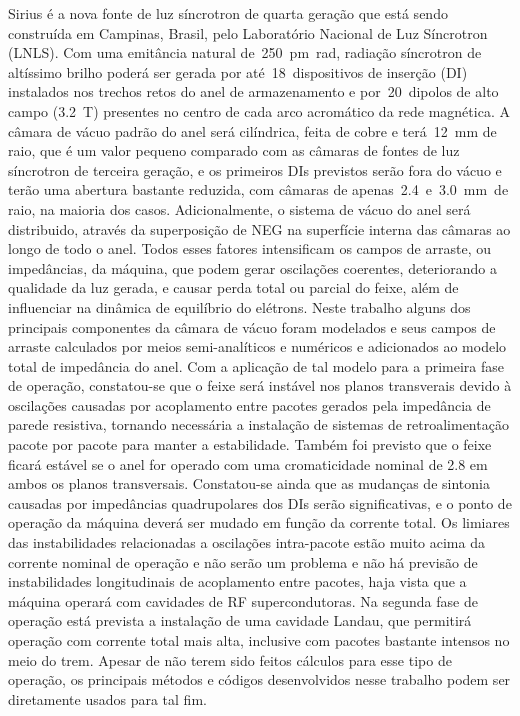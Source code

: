 Sirius é a nova fonte de luz síncrotron de quarta geração que está sendo construída em Campinas, Brasil, pelo Laboratório Nacional de Luz Síncrotron (LNLS). Com uma emitância natural de~\SI{250}{\pico\meter\radian}, radiação síncrotron de altíssimo brilho poderá ser gerada por até~\si{18}~dispositivos de inserção (DI) instalados nos trechos retos do anel de armazenamento e por~\si{20}~dipolos de alto campo (\SI{3.2}{\tesla}) presentes no centro de cada arco acromático da rede magnética. A câmara de vácuo padrão do anel será cilíndrica, feita de cobre e terá~\SI{12}{\milli\meter} de raio, que é um valor pequeno comparado com as câmaras de fontes de luz síncrotron de terceira geração, e os primeiros DIs previstos serão fora do vácuo e terão uma abertura bastante reduzida, com câmaras de apenas~\SI{2.4}{}~e~\SI{3.0}{\milli\meter}~de raio, na maioria dos casos. Adicionalmente, o sistema de vácuo do anel será distribuido, através da superposição de NEG na superfície interna das câmaras ao longo de todo o anel. Todos esses fatores intensificam os campos de arraste, ou impedâncias, da máquina, que podem gerar oscilações coerentes, deteriorando a qualidade da luz gerada, e causar perda total ou parcial do feixe, além de influenciar na dinâmica de equilíbrio do elétrons. Neste trabalho alguns dos principais componentes da câmara de vácuo foram modelados e seus campos de arraste calculados por meios semi-analíticos e numéricos e adicionados ao modelo total de impedância do anel. Com a aplicação de tal modelo para a primeira fase de operação, constatou-se que o feixe será instável nos planos transverais devido à oscilações causadas por acoplamento entre pacotes gerados pela impedância de parede resistiva, tornando necessária a instalação de sistemas de retroalimentação pacote por pacote para manter a estabilidade. Também foi previsto que o feixe ficará estável se o anel for operado com uma cromaticidade nominal de 2.8 em ambos os planos transversais. Constatou-se ainda que as mudanças de sintonia causadas por impedâncias quadrupolares dos DIs serão significativas, e o ponto de operação da máquina deverá ser mudado em função da corrente total. Os limiares das instabilidades relacionadas a oscilações intra-pacote estão muito acima da corrente nominal de operação e não serão um problema e não há previsão de instabilidades longitudinais de acoplamento entre pacotes, haja vista que a máquina operará com cavidades de RF supercondutoras. Na segunda fase de operação está prevista a instalação de uma cavidade Landau, que permitirá operação com corrente total mais alta, inclusive com pacotes bastante intensos no meio do trem. Apesar de não terem sido feitos cálculos para esse tipo de operação, os principais métodos e códigos desenvolvidos nesse trabalho podem ser diretamente usados para tal fim.
